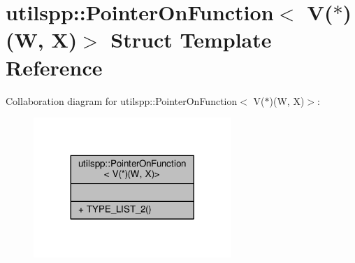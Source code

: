 \hypertarget{structutilspp_1_1PointerOnFunction_3_01V_07_5_08_07W_00_01X_08_4}{\section{utilspp\-:\-:Pointer\-On\-Function$<$ V($\ast$)(W, X)$>$ Struct Template Reference}
\label{structutilspp_1_1PointerOnFunction_3_01V_07_5_08_07W_00_01X_08_4}
}


Collaboration diagram for utilspp\-:\-:Pointer\-On\-Function$<$ V($\ast$)(W, X)$>$\-:\nopagebreak
\begin{figure}[H]
\begin{center}
\leavevmode
\includegraphics[width=212pt]{structutilspp_1_1PointerOnFunction_3_01V_07_5_08_07W_00_01X_08_4__coll__graph}
\end{center}
\end{figure}
